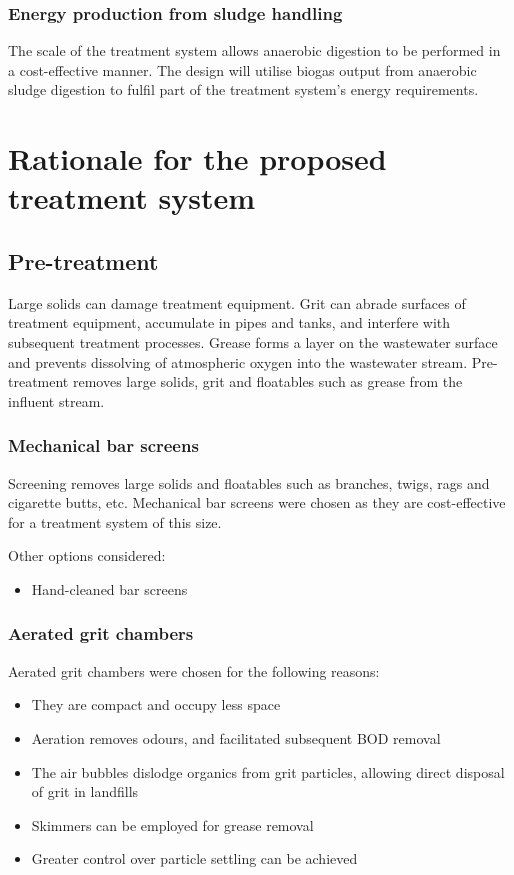 \documentclass[a4paper,10pt]{article}
\begin{document}
\subsubsection{Energy production from sludge handling}
\label{sec:energy_production_from_sludge_handling}
The scale of the treatment system allows anaerobic digestion to be performed in a cost-effective manner. The design will utilise biogas output from anaerobic sludge digestion to fulfil part of the treatment system's energy requirements.






\section{Rationale for the proposed treatment system}
\subsection{Pre-treatment}
Large solids can damage treatment equipment.
Grit can abrade surfaces of treatment equipment, accumulate in pipes and tanks, and interfere with subsequent treatment processes. 
Grease forms a layer on the wastewater surface and prevents dissolving of atmospheric oxygen into the wastewater stream.
Pre-treatment removes large solids, grit and floatables such as grease from the influent stream.

\subsubsection{Mechanical bar screens}
Screening removes large solids and floatables such as branches, twigs, rags and cigarette butts, etc. Mechanical bar screens were chosen as they are cost-effective for a treatment system of this size.

Other options considered:
\begin{itemize}
\item Hand-cleaned bar screens
\end{itemize}

\subsubsection{Aerated grit chambers}
Aerated grit chambers were chosen for the following reasons:
\begin{itemize}
\item They are compact and occupy less space
\item Aeration removes odours, and facilitated subsequent BOD removal
\item The air bubbles dislodge organics from grit particles, allowing direct disposal of grit in landfills
\item Skimmers can be employed for grease removal
\item Greater control over particle settling can be achieved
\end{itemize}
\end{document}
